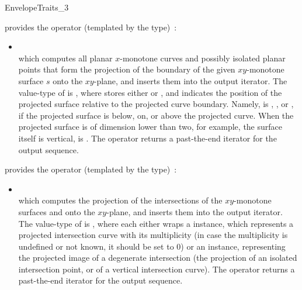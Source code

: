 \begin{ccRefConcept}{EnvelopeTraits_3}
{provides the operator (templated by the  type)~:
 \begin{itemize}
 \item {} \\
 which computes all planar $x$-monotone curves and possibly isolated planar 
 points that form the projection of the boundary of the given $xy$-monotone 
 surface $s$ onto the $xy$-plane, and inserts them into the output iterator. 
 The value-type of  is
 , where  stores either 
  or , and  
 indicates the position of the projected surface relative to the projected
 curve boundary. Namely,  is ,
 , or , if the projected 
 surface is below, on, or above the projected curve. When the projected 
 surface is of dimension lower than two, for example, the surface itself is 
 vertical,  is . The operator 
 returns a past-the-end iterator for the output sequence.
 \end{itemize}}
 
{provides the operator (templated by the  type)~:
 \begin{itemize}
 \item {} \\
 which computes the projection of the intersections of the
 $xy$-monotone surfaces  and  onto the $xy$-plane,
 and inserts them into the output iterator.
 The value-type of  is , where
 each  either wraps a 
 instance, which represents a projected intersection curve with its
 multiplicity (in case the multiplicity is undefined or not known, it
 should be set to $0$) or an  instance, representing the
 projected image of a degenerate intersection (the projection of an
 isolated intersection point, or of a vertical intersection curve).
 The operator returns a past-the-end iterator for the output sequence.
 \end{itemize}}


\end{ccRefConcept}
